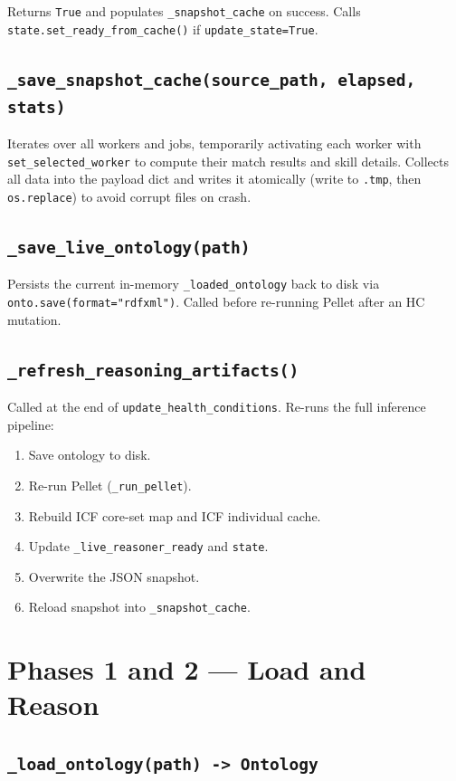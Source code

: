 ﻿\documentclass[12pt,a4paper]{article}
\begin{document}
Returns \texttt{True} and populates \texttt{\_snapshot\_cache} on success. Calls \texttt{state.set\_ready\_from\_cache()} if \texttt{update\_state=True}.

\subsection{\texttt{\_save\_snapshot\_cache(source\_path, elapsed, stats)}}

Iterates over all workers and jobs, temporarily activating each worker with \texttt{set\_selected\_worker} to compute their match results and skill details. Collects all data into the payload dict and writes it atomically (write to \texttt{.tmp}, then \texttt{os.replace}) to avoid corrupt files on crash.

\subsection{\texttt{\_save\_live\_ontology(path)}}

Persists the current in-memory \texttt{\_loaded\_ontology} back to disk via \texttt{onto.save(format="rdfxml")}. Called before re-running Pellet after an HC mutation.

\subsection{\texttt{\_refresh\_reasoning\_artifacts()}}

Called at the end of \texttt{update\_health\_conditions}. Re-runs the full inference pipeline:
\begin{enumerate}[noitemsep]
  \item Save ontology to disk.
  \item Re-run Pellet (\texttt{\_run\_pellet}).
  \item Rebuild ICF core-set map and ICF individual cache.
  \item Update \texttt{\_live\_reasoner\_ready} and \texttt{state}.
  \item Overwrite the JSON snapshot.
  \item Reload snapshot into \texttt{\_snapshot\_cache}.
\end{enumerate}

\clearpage
\section{Phases 1 and 2 --- Load and Reason}

\subsection{\texttt{\_load\_ontology(path) -> Ontology}}
\end{document}
